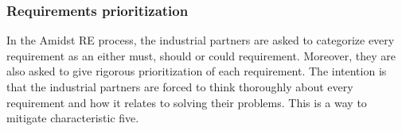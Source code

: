 \subsubsection*{Requirements prioritization}

In the Amidst RE process, the industrial partners are asked to categorize every requirement as an either must, should or could requirement.  Moreover, they are also asked to give rigorous prioritization of each requirement.  The intention is that the industrial partners are forced to think thoroughly about every requirement and how it relates to solving their problems.  This is a way to mitigate characteristic five.

